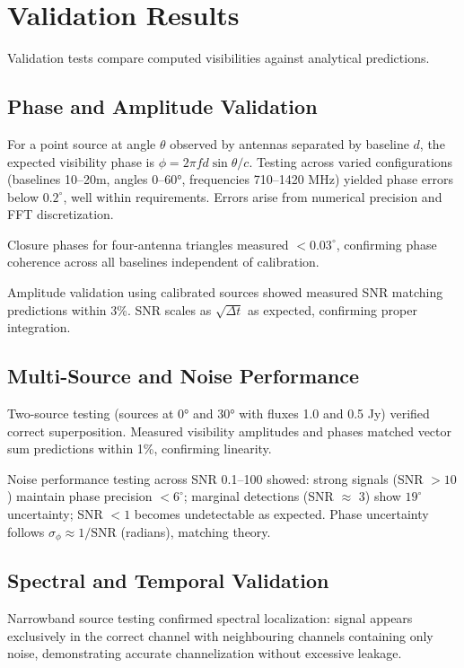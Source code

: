 \section{Validation Results}

Validation tests compare computed visibilities against analytical predictions.

\subsection{Phase and Amplitude Validation}

For a point source at angle $\theta$ observed by antennas separated by baseline $d$, the expected visibility phase is $\phi = 2\pi f d \sin\theta / c$. Testing across varied configurations (baselines 10–20m, angles 0–60°, frequencies 710–1420 MHz) yielded phase errors below $0.2^\circ$, well within requirements. Errors arise from numerical precision and FFT discretization.

Closure phases for four-antenna triangles measured $< 0.03^\circ$, confirming phase coherence across all baselines independent of calibration.

Amplitude validation using calibrated sources showed measured SNR matching predictions within 3\%. SNR scales as $\sqrt{\Delta t}$ as expected, confirming proper integration.

\subsection{Multi-Source and Noise Performance}

Two-source testing (sources at 0° and 30° with fluxes 1.0 and 0.5 Jy) verified correct superposition. Measured visibility amplitudes and phases matched vector sum predictions within 1\%, confirming linearity.

Noise performance testing across SNR 0.1–100 showed: strong signals (SNR $> 10$) maintain phase precision $< 6^\circ$; marginal detections (SNR $\approx$ 3) show $19^\circ$ uncertainty; SNR $< 1$ becomes undetectable as expected. Phase uncertainty follows $\sigma_\phi \approx 1/\mathrm{SNR}$ (radians), matching theory.

\subsection{Spectral and Temporal Validation}

Narrowband source testing confirmed spectral localization: signal appears exclusively in the correct channel with neighbouring channels containing only noise, demonstrating accurate channelization without excessive leakage.

